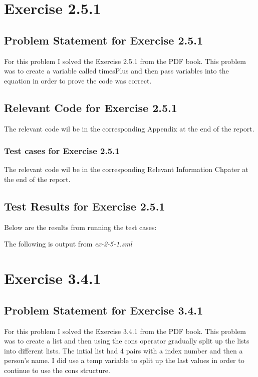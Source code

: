 \documentclass{report}
\begin{document}
\chapter{Exercise 2.5.1}
\label{cha:exercise-2-5-1}

\section{Problem Statement for Exercise 2.5.1}
\label{sec:problem-statement-ex-2-5-1}
  For this problem I solved the Exercise 2.5.1 from the PDF book.
  This problem was to create a variable called timesPlus and then
  pass variables into the equation in order to prove the code was
  correct.

\section{Relevant Code for Exercise 2.5.1}
\label{sec:relevant-code-ex-2-5-1}
  The relevant code wil be in the corresponding Appendix at the
  end of the report.

\subsection{Test cases for Exercise 2.5.1}
\label{sec:test-casesex-2-5-1}
The relevant code wil be in the corresponding Relevant Information 
Chpater at the end of the report.

\section{Test Results for Exercise 2.5.1}
\label{sec:tests-ex-2-5-1}

Below are the results from running the test cases:

The following is output from \emph{ex-2-5-1.sml}


\chapter{Exercise 3.4.1}
\label{cha:exercise-3-4-1}

\section{Problem Statement for Exercise 3.4.1}
\label{sec:problem-statement-ex-3-4-1}
  For this problem I solved the Exercise 3.4.1 from the PDF book.
  This problem was to create a list and then using the cons operator
  gradually split up the lists into different lists. The intial list
  had 4 pairs with a index number and then a person's name. I did use
  a temp variable to split up the last values in order to continue to
  use the cons structure.
\end{document}
